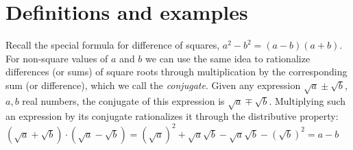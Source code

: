 \documentclass{ximera}
\begin{document}




\section{Definitions and examples}

Recall the special formula for difference of squares, $a^2-b^2 = (a-b)(a+b)$. For non-square values of $a$ and $b$ we can use the same idea to rationalize differences (or sums) of square roots through multiplication by the corresponding sum (or difference), which we call the {\it conjugate}.
Given any expression $\sqrt{a} \pm \sqrt{b}$, $a,b$ real numbers, the conjugate of this expression is $\sqrt{a} \mp \sqrt{b}$. Multiplying such an expression by its conjugate rationalizes it through the distributive property: $(\sqrt{a} + \sqrt{b})\cdot(\sqrt{a} - \sqrt{b}) = (\sqrt{a})^2 + \sqrt{a}\sqrt{b} - \sqrt{a}\sqrt{b} - (\sqrt{b})^2 = a - b$
\end{document}

